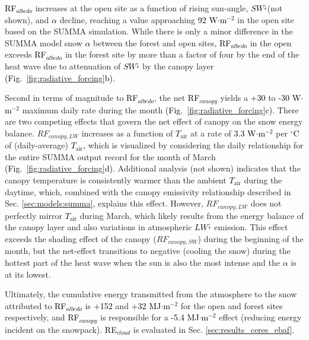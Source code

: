 \documentclass[draft]{agujournal2019}
\newcommand{\fig}[2]{\textcolor{black}{(Fig.~\ref{#1}{#2})}}   %
\newcommand{\mynum}[1]{\textcolor{black}{#1}}
\newcommand{\tair}{\textcolor{black}{$T_{\mathrm{air}}$}\xspace}
\newcommand{\lwdn}{\textcolor{black}{$LW^{\downarrow}$}\xspace}
\newcommand{\swdn}{\textcolor{black}{$SW^{\downarrow}$}\xspace}
\newcommand{\albedo}{\textcolor{black}{$\alpha$}\xspace}
\newcommand{\rfalb}{\textcolor{black}{RF$_{albedo}$}\xspace}
\newcommand{\rfcirrus}{\textcolor{black}{RE$_{cloud}$}\xspace}
\newcommand{\rfcanopy}{\textcolor{black}{RF$_{canopy}$}\xspace}
\newcommand{\wmsq}{\textcolor{black}{W$\cdot$m$^{-2}$}\xspace}
\newcommand{\degrc}{\textcolor{black}{$^\circ$C}\xspace}
\newcommand{\mjmtwo}{\textcolor{black}{MJ$\cdot$m$^{-2}$}\xspace}
\begin{document}
\rfalb increases at the open site as a function of rising sun-angle, \swdn (not shown), and \albedo decline, reaching a value approaching \mynum{92} \wmsq in the open site based on the SUMMA simulation.
While there is only a minor difference in the SUMMA model snow \albedo between the forest and open sites, \rfalb in the open exceeds \rfalb in the forest site by more than a factor of four by the end of the heat wave due to attenuation of \swdn by the canopy layer \fig{fig:radiative_forcing}{b}.

Second in terms of magnitude to \rfalb, the net \rfcanopy yields a \mynum{+30} to \mynum{-30} \wmsq maximum daily rate during the month \fig{fig:radiative_forcing}{c}.
There are two competing effects that govern the net effect of canopy on the snow energy balance. 
$RF_{canopy,LW}$ increases as a function of \tair at a rate of \mynum{3.3} \wmsq per \degrc of (daily-average) \tair, which is visualized by considering the daily relationship for the entire SUMMA output record for the month of March \fig{fig:radiative_forcing}{d}.
Additional analysis (not shown) indicates that the canopy temperature is consistently warmer than the ambient \tair during the daytime, which, combined with the canopy emissivity relationship described in Sec. \ref{sec:models:summa}, explains this effect.
However, $RF_{canopy,LW}$ does not perfectly mirror \tair during March, which likely results from the energy balance of the canopy layer and also variations in atmospheric \lwdn emission.
This effect exceeds the shading effect of the canopy ($RF_{canopy,SW}$) during the beginning of the month, but the net-effect transitions to negative (cooling the snow) during the hottest part of the heat wave when the sun is also the most intense and the \albedo is at its lowest.

Ultimately, the cumulative energy transmitted from the atmosphere to the snow attributed to \rfalb is \mynum{+152} and \mynum{+32} \mjmtwo for the open and forest sites respectively, and \rfcanopy is responsible for a \mynum{-5.4} \mjmtwo effect (reducing energy incident on the snowpack).
\rfcirrus is evaluated in Sec. \ref{sec:results_ceres_ebaf}.


\end{document}
